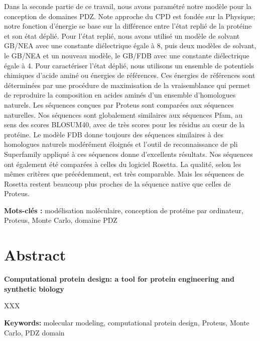 Dans la seconde partie de ce travail, nous avons paramétré notre modèle pour la conception de domaines PDZ. Note approche du CPD est fondée sur la Physique; notre fonction d’énergie se base sur la différence entre l’état replié de la protéine et son état déplié. Pour l’état replié, nous avons utilisé un modèle de solvant GB/NEA avec une constante diélectrique égale à 8, puis  deux modèles de solvant, le GB/NEA et un nouveau modèle, le GB/FDB avec une constante diélectrique égale à 4. Pour caractériser l’état déplié, nous utilisons un ensemble de potentiels chimiques d’acide aminé ou énergies de références. Ces énergies de références sont déterminées par une procédure de maximisation de la vraisemblance qui permet de reproduire la composition en acides aminés d’un ensemble d’homologues naturels. Les séquences conçues par Proteus sont comparées aux séquences naturelles. Nos séquences sont globalement similaires aux séquences Pfam, au sens des scores BLOSUM40, avec de très scores pour les résidus au cœur de la protéine. Le modèle FDB donne toujours des séquences similaires à des homologues naturels modérément éloignés et l’outil de reconnaissance de pli Superfamily appliqué à ces séquences donne d’excellents résultats. Nos séquences ont également été comparées à celles du logiciel Rosetta. La qualité, selon les mêmes critères que précédemment, est très comparable. Mais les séquences de Rosetta restent beaucoup plus proches de la séquence native que celles de Proteus.   


\bigskip

\textbf{Mots-clés :} modélisation moléculaire, conception de protéine par ordinateur, Proteus, Monte Carlo, domaine PDZ

\vfill



\section*{Abstract}

{\large\bf\noindent Computational protein design: a tool for protein engineering and synthetic biology}

\bigskip

XXX

\bigskip

\textbf{Keywords:} molecular modeling, computational protein design, Proteus, Monte Carlo, PDZ domain


